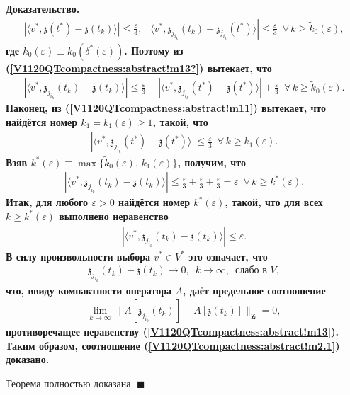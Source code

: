 \documentclass{report}
\newenvironment{Proof}{\par\noindent\bf Доказательство.\rm}{ $\blacksquare$\par}
\begin{document}
\begin{Proof}
\begin{gather*}
|\langle v^*,\mathfrak{z}(t^*)-\mathfrak{z}(t_k)\rangle|\leqslant\frac\varepsilon3,\,\,\,|\langle v^*,\mathfrak{z}_{j_{i_k}}(t_k)-
\mathfrak{z}_{j_{i_k}}(t^*)\rangle|\leqslant\frac\varepsilon3\,\,\,\forall\,k\geqslant\tilde{k}_0(\varepsilon),
\end{gather*}
где $\tilde{k}_0(\varepsilon)\equiv k_0(\delta^*(\varepsilon))$. Поэтому из (\ref{V1120QTcompactness:abstract!m13?}) вытекает, что
\begin{gather*}
|\langle v^*,\mathfrak{z}_{j_{i_k}}(t_k)-\mathfrak{z}(t_k)\rangle|\leqslant\frac\varepsilon3+
|\langle v^*,\mathfrak{z}_{j_{i_k}}(t^*)-\mathfrak{z}(t^*)\rangle|+\frac\varepsilon3\,\,\,\forall\,k\geqslant\tilde{k}_0(\varepsilon).
\end{gather*}
Наконец, из (\ref{V1120QTcompactness:abstract!m11}) вытекает, что найдётся номер $k_1=k_1(\varepsilon)\geqslant1$, такой, что
\begin{gather*}
|\langle v^*,\mathfrak{z}_{j_{i_k}}(t^*)-\mathfrak{z}(t^*)\rangle|\leqslant\frac\varepsilon3\,\,\,\forall\,k\geqslant k_1(\varepsilon).
\end{gather*}
Взяв $k^*(\varepsilon)\equiv\max\{\tilde{k}_0(\varepsilon),\,k_1(\varepsilon)\}$, получим, что
\begin{gather*}
|\langle v^*,\mathfrak{z}_{j_{i_k}}(t_k)-\mathfrak{z}(t_k)\rangle|\leqslant\frac\varepsilon3+\frac\varepsilon3+\frac\varepsilon3=\varepsilon\,\,\,\forall\,k\geqslant {k}^*(\varepsilon).
\end{gather*}
Итак, для любого $\varepsilon>0$ найдётся номер $k^*(\varepsilon)$, такой, что для всех $k\geqslant {k}^*(\varepsilon)$ выполнено неравенство
\begin{gather*}
|\langle v^*,\mathfrak{z}_{j_{i_k}}(t_k)-\mathfrak{z}(t_k)\rangle|\leqslant\varepsilon.
\end{gather*}
В силу произвольности выбора $v^*\in V^*$ это означает, что
\begin{gather*}
\mathfrak{z}_{j_{i_k}}(t_k)-\mathfrak{z}(t_k)\to0,\,\,\,k\to\infty,\,\,\,\mbox{слабо в $V$},
\end{gather*}
что, ввиду компактности оператора $A$, даёт предельное соотношение
\begin{gather*}
\lim\limits_{k\to\infty}\|A[\mathfrak{z}_{j_{i_k}}(t_k)]-A[\mathfrak{z}(t_k)]\|_{\mathbf{Z}}=0,
\end{gather*}
противоречащее неравенству (\ref{V1120QTcompactness:abstract!m13}). Таким образом, соотношение (\ref{V1120QTcompactness:abstract!m2.1}) доказано.

Теорема полностью доказана.
\end{Proof}
\end{document}
